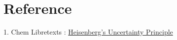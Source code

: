 \documentclass[]{article}
\begin{document}
\section{Reference}
1. Chem Libretexts : \href{https://chem.libretexts.org/Bookshelves/Physical_and_Theoretical_Chemistry_Textbook_Maps/Supplemental_Modules_(Physical_and_Theoretical_Chemistry)/Quantum_Mechanics/02._Fundamental_Concepts_of_Quantum_Mechanics/Heisenberg's_Uncertainty_Principle}{Heisenberg's Uncertainty Principle}
\end{document}
